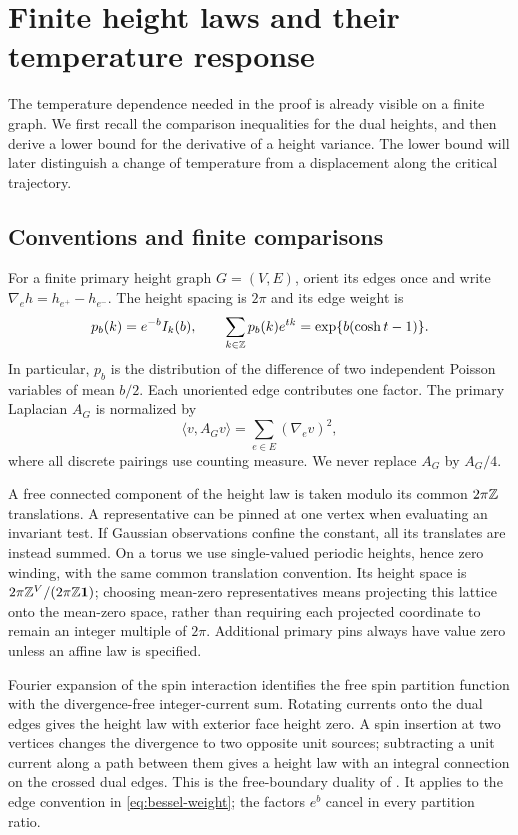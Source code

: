 \section{Finite height laws and their temperature response}\label{sec:finite}

The temperature dependence needed in the proof is already visible on a
finite graph.  We first recall the comparison inequalities for the dual
heights, and then derive a lower bound for the derivative of a height
variance.  The lower bound will later distinguish a change of temperature
from a displacement along the critical trajectory.

\subsection{Conventions and finite comparisons}

For a finite primary height graph $G=(V,E)$, orient its edges once and
write $\nabla_e h=h_{e^+}-h_{e^-}$.  The height spacing is $2\pi$ and
its edge weight is
\begin{equation}\label{eq:bessel-weight}
 p_b(k)=e^{-b}I_k(b),\qquad
 \sum_{k\in\mathbb Z}p_b(k)e^{tk}=\exp\{b(\cosh t-1)\}.
\end{equation}
In particular, $p_b$ is the distribution of the difference of two
independent Poisson variables of mean $b/2$.  Each unoriented edge
contributes one factor.  The primary Laplacian $A_G$ is normalized by
\begin{equation}\label{eq:primary-energy}
 \langle v,A_Gv\rangle=\sum_{e\in E}(\nabla_ev)^2,
\end{equation}
where all discrete pairings use counting measure.  We never replace
$A_G$ by $A_G/4$.

A free connected component of the height law is taken modulo its common
$2\pi\mathbb Z$ translations.  A representative can be pinned at one vertex
when evaluating an invariant test.  If Gaussian observations confine the
constant, all its translates are instead summed.  On a torus we use
single-valued periodic heights, hence zero winding, with the same common
translation convention.  Its height space is
$2\pi\mathbb Z^{V}/(2\pi\mathbb Z\mathbf 1)$; choosing mean-zero representatives means
projecting this lattice onto the mean-zero space, rather than requiring
each projected coordinate to remain an integer multiple of $2\pi$.  Additional primary pins always have value zero
unless an affine law is specified.

Fourier expansion of the spin interaction identifies the free spin
partition function with the divergence-free integer-current sum.  Rotating
currents onto the dual edges gives the height law with exterior face
height zero.  A spin insertion at two vertices changes the divergence to
two opposite unit sources; subtracting a unit current along a path between
them gives a height law with an integral connection on the crossed dual
edges.  This is the free-boundary duality of \cite[Lemma~2.1]{X}.
It applies to the edge convention in \eqref{eq:bessel-weight}; the factors
$e^b$ cancel in every partition ratio.

